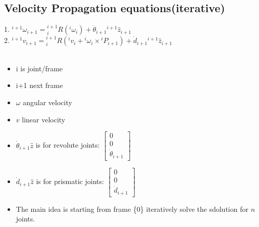 \documentclass{article}
\begin{document}

\subsection{Velocity Propagation equations(iterative)}
1. ${}^{i+1}\omega_{i+1}={}^{i+1}_iR({}^i \omega_i) + \dot{\theta}_{i+1} {}^{i+1}\hat{z}_{i+1}$\\
2. ${}^{i+1}v_{i+1}={}^{i+1}_iR({}^i v_i + {}^i \omega_i \times {}^i P_{i+1}) + \dot{d}_{i+1} {}^{i+1}\hat{z}_{i+1}$\\\\
\begin{itemize}
    \item i is joint/frame
    \item i+1 next frame
    \item $\omega$ angular velocity
    \item $v$ linear velocity
    \item $\dot{\theta}_{i+1} \hat{z}$ is for revolute joints: $\begin{bmatrix}
        0\\
        0\\
        \dot{\theta}_{i+1}
    \end{bmatrix}$
    \item $\dot{d}_{i+1} \hat{z}$ is for prismatic joints: $\begin{bmatrix}
        0\\
        0\\
        \dot{d}_{i+1}
    \end{bmatrix}$
    \item The main idea is starting from frame \{0\} iteratively solve the sdolution for $n$ joints. 
\end{itemize}
\end{document}
